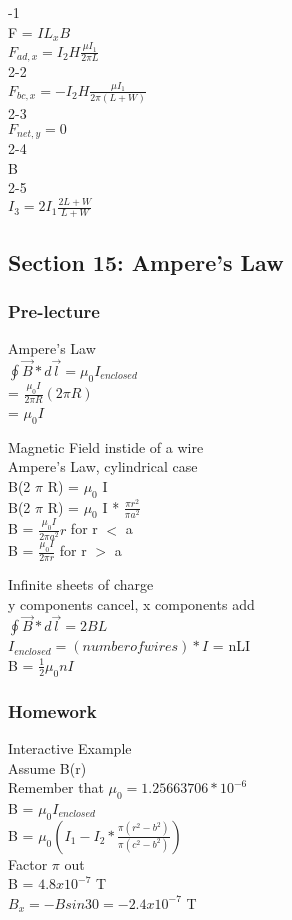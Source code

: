 \documentclass{article}
\begin{document}
\vspace{2mm}

-1 \\
F = $IL_xB$ \\
$F_{ad,x} = I_2 H \frac{\mu I_1}{2 \pi L}$ \\
2-2 \\
$F_{bc,x} = -I_2 H \frac{\mu I_1}{2 \pi (L+W)}$ \\
2-3 \\
$F_{net,y} = 0$ \\
2-4 \\
B \\
2-5 \\
$I_3 = 2I_1 \frac{2L+W}{L+W}$

\subsection{Section 15: Ampere's Law}
\subsubsection{Pre-lecture}
\noindent
Ampere's Law \\
$\oint \vec{B} * d \vec{l} = \mu_0 I_{enclosed}$ \\
= $\frac{\mu_0 I}{2 \pi R}(2 \pi R)$ \\
= $\mu_0 I$

\vspace{2mm}

\noindent
Magnetic Field instide of a wire\\
Ampere's Law, cylindrical case \\
B(2 $\pi$ R) = $\mu_0$ I \\
B(2 $\pi$ R) = $\mu_0$ I * $\frac{\pi r^2}{\pi a^2}$ \\
B = $\frac{\mu_0 I}{2 \pi a^2} r$ for r $<$ a \\
B = $\frac{\mu_0 I}{2 \pi r}$ for r $>$ a

\vspace{2mm}

\noindent
Infinite sheets of charge \\
y components cancel, x components add \\
$\oint \vec{B}*d\vec{l} = 2BL$ \\
$I_{enclosed} = (number of wires) * I$ = nLI \\
B = $\frac{1}{2} \mu_0 n I$

\subsubsection{Homework}
\noindent
Interactive Example \\
Assume B(r) \\
Remember that $\mu_0 = 1.25663706 * 10^{-6}$ \\
B = $\mu_0 I_{enclosed}$ \\
B = $\mu_0 (I_1 - I_2 *\frac{\pi (r^2 - b^2)}{\pi (c^2 - b^2)})$ \\
Factor $\pi$ out \\
B = $4.8x10^{-7}$ T \\
$B_x = -B sin 30 = -2.4x10^{-7} $ T
\end{document}
